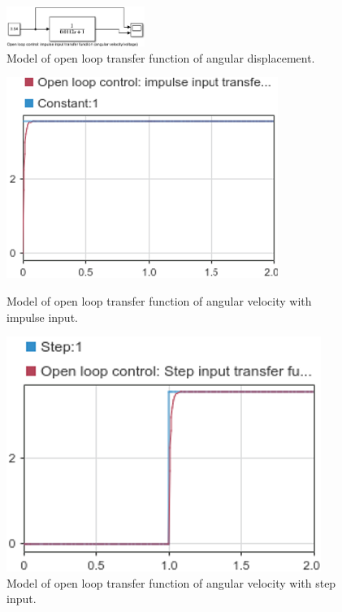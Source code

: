 \documentclass[conference]{IEEEtran}
\begin{document}
\begin{figure}[htbp]
    \centerline{\includegraphics[width = 0.4\textwidth]{../img/q1-2.png}}
    \caption{Model of open loop transfer function of angular displacement.}
\end{figure}

\begin{figure}[htbp]
    \centering
    \begin{minipage}[b]{0.24\textwidth}
      \includegraphics[width=\textwidth]{../img/q1-1.png}
      \caption{Model of open loop transfer function of angular velocity with impulse input.}
    \end{minipage}
    \hfill
    \begin{minipage}[b]{0.24\textwidth}
      \includegraphics[width=\textwidth]{../img/q1-3.png}
      \caption{Model of open loop transfer function of angular velocity with step input.}
    \end{minipage}
\end{figure}
\end{document}
